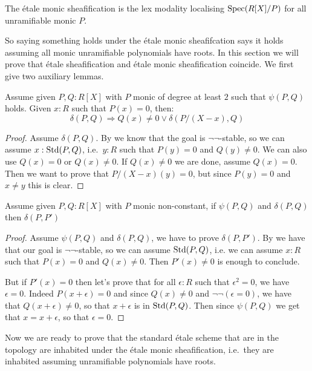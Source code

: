 \begin{definition}
The \'etale monic sheafification is the lex modality localising $\operatorname{Spec}(R[X]/P)$ for all unramifiable monic $P$.
\end{definition}

So saying something holds under the \'etale monic sheafifcation says it holds assuming all monic unramifiable polynomials have roots. In this section we will prove that \'etale sheafification and \'etale monic sheafification coincide. We first give two auxiliary lemmas.

\begin{lemma}\label{psi-implies-delta-root-decomposition}
Assume given $P,Q:R[X]$ with $P$ monic of degree at least $2$ such that $\psi(P,Q)$ holds. Given $x:R$ such that $P(x)=0$, then:
\[\delta(P,Q) \Rightarrow Q(x)\not=0 \lor \delta(P/(X-x),Q)\]
\end{lemma}

\begin{proof}
Assume $\delta(P,Q)$. By  we know that the goal is $\neg\neg$-stable, so we can assume $x:\mathrm{Std}(P,Q)$, i.e.\ $y:R$ such that $P(y)=0$ and $Q(y)\not=0$. We can also use $Q(x)=0$ or $Q(x)\not=0$. If $Q(x)\not=0$ we are done, assume $Q(x)=0$. Then we want to prove that $P/(X-x)(y) = 0$, but since $P(y)=0$ and $x\not=y$ this is clear.
\end{proof}

\begin{lemma}\label{psi-delta-imples-unramifiable}
Assume given $P,Q:R[X]$ with $P$ monic non-constant, if $\psi(P,Q)$ and $\delta(P,Q)$ then $\delta(P,P')$
\end{lemma}

\begin{proof}
Assume $\psi(P,Q)$ and $\delta(P,Q)$, we have to prove $\delta(P,P')$. By  we have that our goal is $\neg\neg$-stable, so we can assume $\mathrm{Std}(P,Q)$, i.e. we can assume $x:R$ such that $P(x)=0$ and $Q(x)\not=0$. Then $P'(x)\not=0$ is enough to conclude. 

But if $P'(x)=0$ then let's prove that for all $\epsilon:R$ such that $\epsilon^2=0$, we have $\epsilon=0$. Indeed $P(x+\epsilon) = 0$ and since $Q(x)\not=0$ and $\neg\neg(\epsilon=0)$, we have that $Q(x+\epsilon)\not=0$, so that $x+\epsilon$ is in $\mathrm{Std}(P,Q)$. Then since $\psi(P,Q)$ we get that $x=x+\epsilon$, so that $\epsilon=0$.
\end{proof}

Now we are ready to prove that the standard \'etale scheme that are in the topology are inhabited under the \'etale monic sheafification, i.e.\ they are inhabited assuming unramifiable polynomials have roots.

